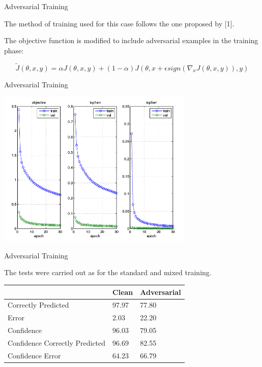 \begin{tframe}{Adversarial Training}

The method of training used for this case follows the one proposed by [1].

\vspace{0.1in}

The objective function is modified to include adversarial examples in the training phase:

$$ 	\tilde{J}(\theta, x, y) = \alpha J(\theta, x, y) + ( 1 - \alpha)J(\theta, x + \epsilon sign(\nabla_{x}J(\theta, x, y)), y) $$

\end{tframe}

\begin{tframe}{Adversarial Training}

\begin{center}
  \includegraphics[width=0.7\textwidth]{img/train-adv.png}
	\label{train-mix} 
\end{center}

\end{tframe}

\begin{tframe}{Adversarial Training}

The tests were carried out as for the standard and mixed training.

\begin{table}[h]
\centering
\begin{tabular}{@{}lll@{}}
\toprule
                               & Clean & Adversarial \\ \midrule
Correctly Predicted            & 97.97 & 77.80       \\
Error                          & 2.03  & 22.20       \\
Confidence                     & 96.03 & 79.05       \\
Confidence Correctly Predicted & 96.69 & 82.55       \\
Confidence Error               & 64.23 & 66.79       \\ \bottomrule
\end{tabular}
\end{table}

\end{tframe}